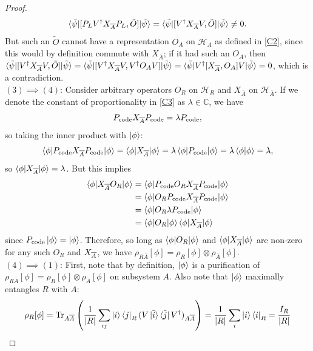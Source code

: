 \documentclass[12pt,a4paper]{report}
\numberwithin{equation}{section}
\newcommand{\ketbra}[2]{\ket{#1}\bra{#2}}
\newcommand{\ketbras}[1]{\ketbra{#1}{#1}}
\newcommand{\Pc}{P_{\text{code}}}
\newcommand{\ol}[1]{\overline{#1}}
\theoremstyle{definition}
\theoremstyle{theorem}
\theoremstyle{theorem}
\theoremstyle{example}
\theoremstyle{definition}
\begin{document}
\begin{proof}
\begin{equation}
		\braket{\tilde{\psi}|[P_{L}V^{\dagger} X_{\ol{A}}P_{L},\tilde{O}]|\tilde{\psi}}=\braket{\tilde{\psi}|[V^{\dagger}X_{\ol{A}}V,\tilde{O}]|\tilde{\psi}}\neq 0.
	\end{equation}
	But such an $\tilde{O}$ cannot have a representation $O_{A}$ on $\mathcal{H}_{A}$ as defined in \ref{C2}, since this would by definition commute with $X_{\ol{A}}$; if it had such an $O_{A}$, then $\braket{\tilde{\psi}|[V^{\dagger}X_{\ol{A}}V,\tilde{O}]|\tilde{\psi}}=\braket{\tilde{\psi}|[V^{\dagger}X_{\ol{A}}V,V^{\dagger}O_{A}V]|\tilde{\psi}}=\braket{\tilde{\psi}|V^{\dagger}[X_{\ol{A}},O_{A}]V|\tilde{\psi}}=0$, which is a contradiction.\\
	$(3)\implies (4)$: Consider arbitrary operators $O_{R}$ on $\mathcal{H}_{R}$ and $X_{\overline{A}}$ on $\mathcal{H}_{\overline{A}}$. If we denote the constant of proportionality in \ref{C3} as $\lambda\in\mathbb{C}$, we have
	\begin{equation}
		\Pc\Xabar\Pc=\lambda\Pc,
	\end{equation}
	so taking the inner product with $\ket{\phi}$:
	\begin{equation}
		\braket{\phi|\Pc\Xabar\Pc|\phi}=\braket{\phi|\Xabar|\phi}=\lambda\braket{\phi|\Pc|\phi}=\lambda\braket{\phi|\phi}=\lambda,
	\end{equation}
	so $\braket{\phi|X_{\overline{A}}|\phi}=\lambda$. But this implies
	\begin{equation}
		\begin{aligned}
			\braket{\phi|\Xabar O_{R}|\phi}&=\braket{\phi|\Pc O_{R}\Xabar\Pc|\phi}\\&=\braket{\phi|O_{R}\Pc\Xabar\Pc|\phi}\\&=\braket{\phi|O_{R}\lambda\Pc|\phi}\\&=\braket{\phi|O_{R}|\phi}\braket{\phi|\Xabar|\phi}
		\end{aligned}
	\end{equation} 
	since $\Pc\ket{\phi}=\ket{\phi}$. Therefore, so long as $\braket{\phi|O_{R}|\phi}$ and $\braket{\phi|X_{\overline{A}}|\phi}$ are non-zero for any such $O_{R}$ and $X_{\overline{A}}$, we have $\rho_{R\overline{A}}[\phi]=\rho_{R}[\phi]\otimes\rho_{\overline{A}}[\phi]$.\\
	$(4)\implies (1)$: First, note that by definition, $\ket{\phi}$ is a purification of $\rho_{R\overline{A}}[\phi]=\rho_{R}[\phi]\otimes\rho_{\overline{A}}[\phi]$ on subsystem $A$. Also note that $\ket{\phi}$ maximally entangles $R$ with $A$:
	\begin{equation}
		\rho_{R}[\phi]=\text{Tr}_{A\overline{A}}\left(\frac{1}{|R|}\sum_{ij}\ketbra{i}{j}_{R}(V\ketbra{\tilde{i}}{\tilde{j}}V^{\dagger})_{A\overline{A}}\right)=\frac{1}{|R|}\sum_{i}\ketbras{i}_{R}=\frac{I_{R}}{|R|}

\end{equation}
\end{proof}
\end{document}
